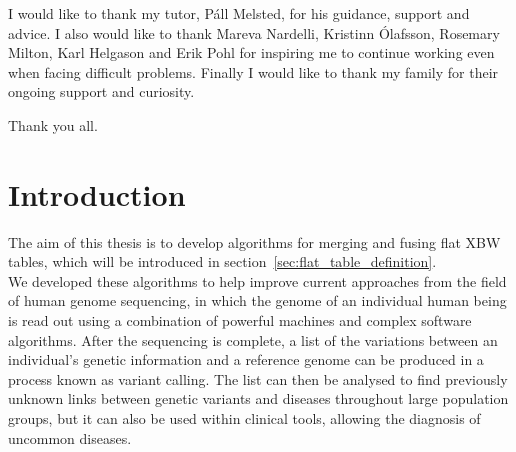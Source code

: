 \documentclass[a4paper,12pt,twoside,BCOR=10mm]{scrbook}
\begin{document}
%
%
%
%
%

I would like to thank my tutor, Páll Melsted, for his guidance, support and advice.
I also would like to thank Mareva Nardelli, Kristinn Ólafsson, Rosemary Milton, Karl Helgason and Erik Pohl
for inspiring me to continue working even when facing difficult problems.
Finally I would like to thank my family for their ongoing support and curiosity.

Thank you all.

\chapter{Introduction}
\setcounter{page}{1}


The aim of this thesis is to develop algorithms for merging and fusing flat XBW tables,
which will be introduced in section~\ref{sec:flat_table_definition}. \\
We developed these algorithms to help improve current approaches from the field of human genome sequencing,
in which the genome of an individual human being is read out using a combination of
powerful machines and complex software algorithms.
After the sequencing is complete, a list of the variations between an individual's genetic information
and a reference genome can be produced in a process known as variant calling.
The list can then be analysed to find previously unknown links between genetic variants and
diseases throughout large population groups, but it can also be used within clinical tools, allowing the
diagnosis of uncommon diseases.
\end{document}
